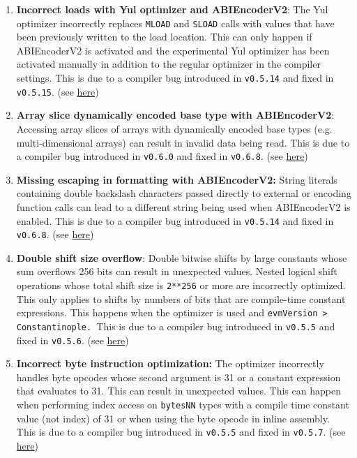 \begin{enumerate}
\item\textbf{Incorrect loads with Yul optimizer and ABIEncoderV2}: The Yul optimizer incorrectly replaces \verb|MLOAD| and \verb|SLOAD| calls with values that have been previously written to the load location. This can only happen if ABIEncoderV2 is activated and the experimental Yul optimizer has been activated manually in addition to the regular optimizer in the compiler settings. This is due to a compiler bug introduced in \verb|v0.5.14| and fixed in \verb|v0.5.15|. (see \href{https://docs.soliditylang.org/en/v0.8.9/bugs.html}{here})

\item\textbf{Array slice dynamically encoded base type with ABIEncoderV2}: Accessing array slices of arrays with dynamically encoded base types (e.g. multi-dimensional arrays) can result in invalid data being read. This is due to a compiler bug introduced in \verb|v0.6.0| and fixed in \verb|v0.6.8|. (see \href{https://docs.soliditylang.org/en/v0.8.9/bugs.html}{here})

\item\textbf{Missing escaping in formatting with ABIEncoderV2: }String literals containing double backslash characters passed directly to external or encoding function calls can lead to a different string being used when ABIEncoderV2 is enabled. This is due to a compiler bug introduced in \verb|v0.5.14| and fixed in \verb|v0.6.8|. (see \href{https://docs.soliditylang.org/en/v0.8.9/bugs.html}{here})

\item\textbf{Double shift size overflow}: Double bitwise shifts by large constants whose sum overflows 256 bits can result in unexpected values. Nested logical shift operations whose total shift size is \verb|2**256| or more are incorrectly optimized. This only applies to shifts by numbers of bits that are compile-time constant expressions. This happens when the optimizer is used and \verb|evmVersion > Constantinople. |This is due to a compiler bug introduced in \verb|v0.5.5| and fixed in \verb|v0.5.6|. (see \href{https://docs.soliditylang.org/en/v0.8.9/bugs.html}{here})

\item\textbf{Incorrect byte instruction optimization: }The optimizer incorrectly handles byte opcodes whose second argument is 31 or a constant expression that evaluates to 31. This can result in unexpected values. This can happen when performing index access on \verb|bytesNN| types with a compile time constant value (not index) of 31 or when using the byte opcode in inline assembly. This is due to a compiler bug introduced in \verb|v0.5.5| and fixed in \verb|v0.5.7|. (see \href{https://docs.soliditylang.org/en/v0.8.9/bugs.html}{here})


\end{enumerate}
